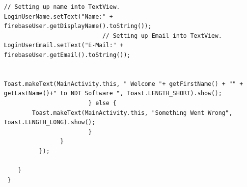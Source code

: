 \begin{itemize}
\begin{lstlisting}[frame=single]
                            // Setting up name into TextView.
LoginUserName.setText("Name:" + firebaseUser.getDisplayName().toString());
                            // Setting up Email into TextView.
LoginUserEmail.setText("E-Mail:" + firebaseUser.getEmail().toString());
                           

Toast.makeText(MainActivity.this, " Welcome "+ getFirstName() + "" + getLastName()+" to NDT Software ", Toast.LENGTH_SHORT).show();
                        } else {
        Toast.makeText(MainActivity.this, "Something Went Wrong", Toast.LENGTH_LONG).show();
                        }
                }
          });

    }
 }
\end{lstlisting}
\href{https://firebase.google.com/docs/auth/android/google-signin}{\color{blue}{Tutorial: Authenticate with Firebase}}\\
\href{https://www.androidhive.info/2016/06/android-getting-started-firebase-simple-login-registration-auth/}{\color{blue}{Beispiel: Login and Registration Authentication}}


\end{itemize}
